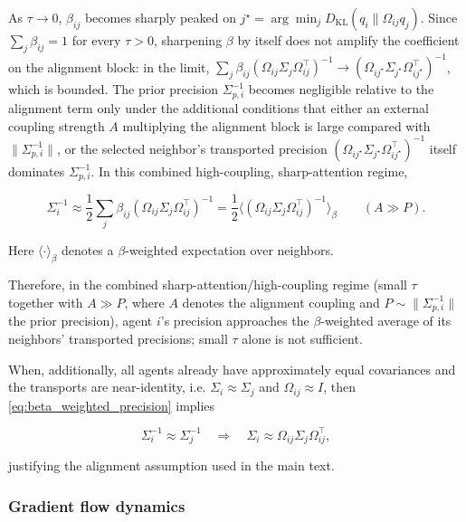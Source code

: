\documentclass[11pt]{article}
\begin{document}
As $\tau \to 0$, $\beta_{ij}$ becomes sharply peaked on $j^\star = \arg\min_j D_{\mathrm{KL}}(q_i \| \Omega_{ij}q_j)$. Since $\sum_j \beta_{ij} = 1$ for every $\tau > 0$, sharpening $\beta$ by itself does not amplify the coefficient on the alignment block: in the limit, $\sum_j \beta_{ij}(\Omega_{ij}\Sigma_j\Omega_{ij}^\top)^{-1} \to (\Omega_{ij^\star}\Sigma_{j^\star}\Omega_{ij^\star}^\top)^{-1}$, which is bounded. The prior precision $\Sigma_{p,i}^{-1}$ becomes negligible relative to the alignment term only under the additional conditions that either an external coupling strength $A$ multiplying the alignment block is large compared with $\|\Sigma_{p,i}^{-1}\|$, or the selected neighbor's transported precision $(\Omega_{ij^\star}\Sigma_{j^\star}\Omega_{ij^\star}^\top)^{-1}$ itself dominates $\Sigma_{p,i}^{-1}$. In this combined high-coupling, sharp-attention regime,

\begin{equation}
\boxed{
\Sigma_i^{-1}
\approx
\frac{1}{2}\sum_j \beta_{ij}
(\Omega_{ij}\Sigma_j\Omega_{ij}^\top)^{-1}
=\frac{1}{2}\big\langle(\Omega_{ij}\Sigma_j\Omega_{ij}^\top)^{-1}
\big\rangle_{\beta}
\qquad (A \gg P).}
\label{eq:beta_weighted_precision}
\end{equation}

Here $\langle \cdot \rangle_{\beta}$ denotes a $\beta$-weighted expectation over neighbors.

Therefore, in the combined sharp-attention/high-coupling regime (small $\tau$ together with $A \gg P$, where $A$ denotes the alignment coupling and $P \sim \|\Sigma_{p,i}^{-1}\|$ the prior precision), agent $i$'s precision approaches the $\beta$-weighted average of its neighbors' transported precisions; small $\tau$ alone is not sufficient.

When, additionally, all agents already have approximately equal covariances and the transports are near-identity, i.e. $\Sigma_i \approx \Sigma_j$ and $\Omega_{ij} \approx I$, then \eqref{eq:beta_weighted_precision} implies

\begin{equation}
\Sigma_i^{-1} \approx \Sigma_j^{-1}
\quad\Longrightarrow\quad
\Sigma_i \approx \Omega_{ij}\Sigma_j\Omega_{ij}^\top,
\end{equation}

justifying the alignment assumption used in the main text.

\subsubsection{Gradient flow dynamics}
\end{document}
